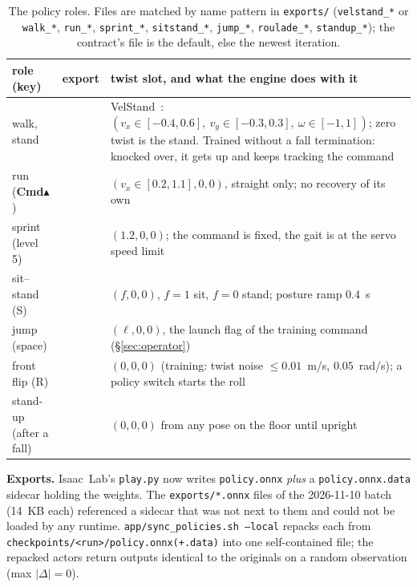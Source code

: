 \documentclass[11pt]{article}
\newcommand{\code}[1]{\texttt{\small #1}}
\newcommand{\cmdkey}{\textsf{\textbf{Cmd}}}      %
\begin{document}
\begin{table}[h]\centering\footnotesize
\newcommand{\ex}[1]{\texttt{\scriptsize #1}}
\begin{tabular}{l>{\raggedright\arraybackslash}p{4.5cm}>{\raggedright\arraybackslash}p{7.3cm}}\toprule
role (key) & export & twist slot, and what the engine does with it \\\midrule
walk, stand & \ex{\polWalk} & VelStand~\cite{microduck}: $(v_x\in[-0.4,0.6],\ v_y\in[-0.3,0.3],\ \omega\in[-1,1])$; zero twist is the stand. Trained without a fall termination: knocked over, it gets up and keeps tracking the command \\
run (\cmdkey$\blacktriangle$) & \ex{\polRun} & $(v_x\in[0.2,1.1],0,0)$, straight only; no recovery of its own \\
sprint (level 5) & \ex{\polSprint} & $(1.2,0,0)$; the command is fixed, the gait is at the servo speed limit \\
sit--stand (S) & \ex{\polSitstand} & $(f,0,0)$, $f=1$ sit, $f=0$ stand; posture ramp 0.4~s \\
jump (space) & \ex{\polJump} & $(\ell,0,0)$, the launch flag of the training command (\S\ref{sec:operator}) \\
front flip (R) & \ex{\polRoulade} & $(0,0,0)$ (training: twist noise $\le0.01$~m/s, $0.05$~rad/s); a policy switch starts the roll \\
stand-up (after a fall) & \ex{\polRecovery} & $(0,0,0)$ from any pose on the floor until upright \\
\bottomrule\end{tabular}
\caption{The policy roles. Files are matched by name pattern in \code{exports/} (\code{velstand\_*} or
\code{walk\_*}, \code{run\_*}, \code{sprint\_*}, \code{sitstand\_*}, \code{jump\_*}, \code{roulade\_*},
\code{standup\_*}); the contract's file is the default, else the newest iteration.}
\label{tab:roles}
\end{table}

\textbf{Exports.} Isaac~Lab's \code{play.py} now writes \code{policy.onnx} \emph{plus} a \code{policy.onnx.data}
sidecar holding the weights. The \code{exports/*.onnx} files of the 2026-11-10 batch (14~KB each) referenced a
sidecar that was not next to them and could not be loaded by any runtime. \code{app/sync\_policies.sh --local}
repacks each from \code{checkpoints/<run>/policy.onnx(+.data)} into one self-contained file; the repacked actors
return outputs identical to the originals on a random observation (max $|\Delta|=0$).
\end{document}
